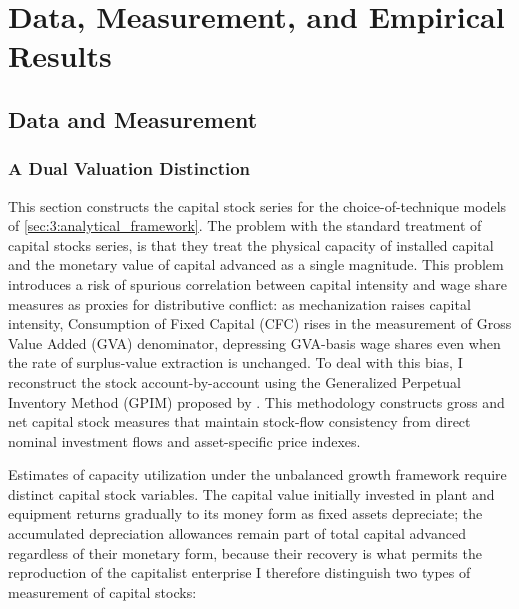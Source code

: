 \section{Data, Measurement, and Empirical Results}
\label{sec:4:empirics}
\subsection{Data and Measurement}
\label{sec:41:data_measurement}

\subsubsection{A Dual Valuation Distinction}
\label{sec:411:dual_valuation}

This section constructs the capital stock series for the
choice-of-technique models of \cref{sec:3:analytical_framework}.
The problem with the standard treatment of capital stocks series, is that they treat the physical capacity of installed capital and the monetary value of capital advanced as a single magnitude. This problem introduces a risk of spurious correlation between capital intensity and wage share measures as proxies for distributive conflict: as mechanization raises capital intensity, Consumption of Fixed Capital (CFC) rises in the measurement of Gross Value Added (GVA)  
denominator, depressing GVA-basis wage shares even when the rate of
surplus-value extraction is unchanged. To deal with this bias, I
reconstruct the stock account-by-account using the Generalized
Perpetual Inventory Method (GPIM) proposed by  \citet[App.~6.5]{Shaikh2016}. This methodology constructs gross and net capital stock measures that maintain stock-flow consistency from direct nominal investment flows and asset-specific price indexes.

Estimates of capacity utilization under the unbalanced growth framework require distinct capital stock variables. The capital value initially invested in plant and equipment returns gradually to its money form as fixed assets depreciate; the accumulated depreciation allowances remain part of total capital advanced regardless of their monetary form, because their recovery is what permits the reproduction of the capitalist enterprise I therefore distinguish two types of measurement of capital stocks:

